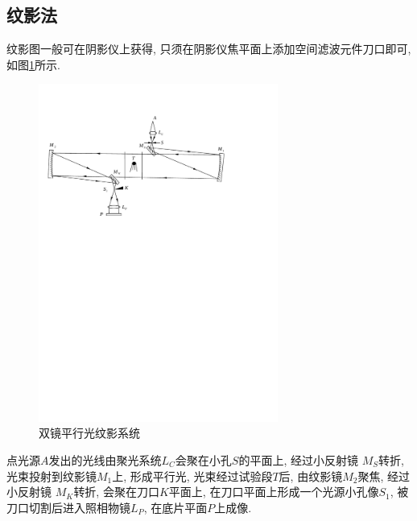 \documentclass[12pt,a4paper,boxed,titlepage]{caspset}
\begin{document}
\subsection{纹影法}
纹影图一般可在阴影仪上获得, 只须在阴影仪焦平面上添加空间滤波元件刀口即可, 如图\ref{schlieren}所示.
\begin{figure}[!htb]
\centering
\includegraphics[width=0.7\textwidth]{schlieren.pdf}
\caption{\label{schlieren}双镜平行光纹影系统}
\end{figure}
点光源$A$发出的光线由聚光系统$L_C$会聚在小孔$S$的平面上, 经过小反射镜 $M_S$转折, 光束投射到纹影镜$M_1$上, 形成平行光, 光束经过试验段$T$后, 由纹影镜$M_2$聚焦, 经过小反射镜 $M_K$转折, 会聚在刀口$K$平面上, 在刀口平面上形成一个光源小孔像$S_1$, 被刀口切割后进入照相物镜$L_P$, 在底片平面$P$上成像.
\end{document}
